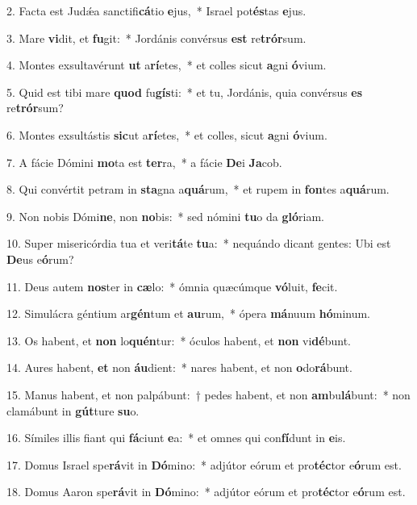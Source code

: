 \item 2. Facta est Judǽa sanctifi\textbf{cá}tio \textbf{e}jus,~* Israel pot\textbf{és}tas \textbf{e}jus.
\item 3. Mare \textbf{vi}dit, et \textbf{fu}git:~* Jordánis convérsus \textbf{est} re\textbf{trór}sum.
\item 4. Montes exsultavérunt \textbf{ut} a\textbf{rí}etes,~* et colles sicut \textbf{a}gni \textbf{ó}vium.
\item 5. Quid est tibi mare \textbf{quod} fu\textbf{gís}ti:~* et tu, Jordánis, quia convérsus \textbf{es} re\textbf{trór}sum?
\item 6. Montes exsultástis \textbf{sic}ut a\textbf{rí}etes,~* et colles, sicut \textbf{a}gni \textbf{ó}vium.
\item 7. A fácie Dómini \textbf{mo}ta est \textbf{ter}ra,~* a fácie \textbf{De}i \textbf{Ja}cob.
\item 8. Qui convértit petram in \textbf{sta}gna a\textbf{quá}rum,~* et rupem in \textbf{fon}tes a\textbf{quá}rum.
\item 9. Non nobis Dómi\textbf{ne}, non \textbf{no}bis:~* sed nómini \textbf{tu}o da \textbf{gló}riam.
\item 10. Super misericórdia tua et veri\textbf{tá}te \textbf{tu}a:~* nequándo dicant gentes: Ubi est \textbf{De}us e\textbf{ó}rum?
\item 11. Deus autem \textbf{nos}ter in \textbf{cæ}lo:~* ómnia quæcúmque \textbf{vó}luit, \textbf{fe}cit.
\item 12. Simulácra géntium ar\textbf{gén}tum et \textbf{au}rum,~* ópera \textbf{má}nuum \textbf{hó}minum.
\item 13. Os habent, et \textbf{non} lo\textbf{quén}tur:~* óculos habent, et \textbf{non} vi\textbf{dé}bunt.
\item 14. Aures habent, \textbf{et} non \textbf{áu}dient:~* nares habent, et non \textbf{o}do\textbf{rá}bunt.
\item 15. Manus habent, et non palpábunt:~† pedes habent, et non \textbf{am}bu\textbf{lá}bunt:~* non clamábunt in \textbf{gút}ture \textbf{su}o.
\item 16. Símiles illis fiant qui \textbf{fá}ciunt \textbf{e}a:~* et omnes qui con\textbf{fí}dunt in \textbf{e}is.
\item 17. Domus Israel spe\textbf{rá}vit in \textbf{Dó}mino:~* adjútor eórum et pro\textbf{téc}tor e\textbf{ó}rum est.
\item 18. Domus Aaron spe\textbf{rá}vit in \textbf{Dó}mino:~* adjútor eórum et pro\textbf{téc}tor e\textbf{ó}rum est.
